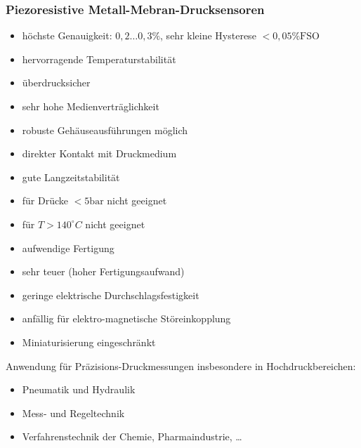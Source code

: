 \subsubsection{Piezoresistive Metall-Mebran-Drucksensoren}
\begin{itemize}[label=$+$]
\item höchste Genauigkeit: $0,2 \ldots 0,3\%$, sehr kleine Hysterese $<0,05\%\mathrm{FSO}$
\item hervorragende Temperaturstabilität
\item überdrucksicher
\item sehr hohe Medienverträglichkeit
\item robuste Gehäuseausführungen möglich
\item direkter Kontakt mit Druckmedium
\item gute Langzeitstabilität
\end{itemize}
\begin{itemize}[label=$-$]
\item für Drücke $<5\mathrm{bar}$ nicht geeignet
\item für $T > 140^\circ C$ nicht geeignet
\item aufwendige Fertigung
\item sehr teuer (hoher Fertigungsaufwand)
\item geringe elektrische Durchschlagsfestigkeit
\item anfällig für elektro-magnetische Störeinkopplung
\item Miniaturisierung eingeschränkt
\end{itemize}
Anwendung für Präzisions-Druckmessungen insbesondere in Hochdruckbereichen:
\begin{itemize}
\item Pneumatik und Hydraulik
\item Mess- und Regeltechnik
\item Verfahrenstechnik der Chemie, Pharmaindustrie, …
\end{itemize}

